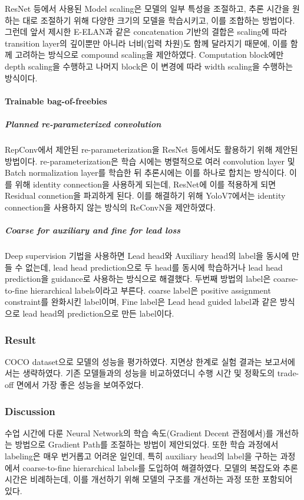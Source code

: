 ResNet\cite{Resnet} 등에서 사용된 Model scaling은 모델의 일부 특성을 조절하고, 추론 시간을 원하는 대로 조절하기 위해
다양한 크기의 모델을 학습시키고, 이를 조합하는 방법이다.
그런데 앞서 제시한 E-ELAN과 같은 concatenation 기반의 결합은 scaling에 따라
transition layer의 깊이뿐만 아니라 너비(입력 차원)도 함께 달라지기 때문에, 이를 함께 고려하는 방식으로 compound scaling을 제안하였다.
Computation block에만 depth scaling을 수행하고 나머지 block은 이 변경에 따라 width scaling을 수행하는 방식이다.

\paragraph*{Trainable bag-of-freebies}

\subparagraph*{Planned re-parameterized convolution} RepConv에서 제안된 re-parameterization을 ResNet 등에서도 활용하기 위해 제안된 방법이다.
re-parameterization은 학습 시에는 병렬적으로 여러 convolution layer 및 Batch normalization layer를 학습한 뒤
추론시에는 이를 하나로 합치는 방식이다. 이를 위해 identity connection을 사용하게 되는데, ResNet에 이를 적용하게 되면 Residual connetion을 파괴하게 된다.
이를 해결하기 위해 YoloV7에서는 identity connection을 사용하지 않는 방식의 ReConvN을 제안하였다.
\subparagraph*{Coarse for auxiliary and fine for lead loss}
Deep supervision 기법을 사용하면 Lead head와 Auxiliary head의 label을 동시에 만들 수 없는데,
lead head prediction으로 두 head를 동시에 학습하거나 lead head prediction을 guidance로 사용하는 방식으로 해결했다.
두번째 방법의 label은 coarse-to-fine hierarchical labels이라고 부른다.
coarse label은 positive assignment constraint를 완화시킨 label이며, Fine label은 Lead head guided label과 같은 방식으로
lead head의 prediction으로 만든 label이다.

\subsubsection{Result}
COCO dataset으로 모델의 성능을 평가하였다. 지면상 한계로 실험 결과는 보고서에서는 생략하였다.
기존 모델들과의 성능을 비교하였더니 수행 시간 및 정확도의 trade-off 면에서 가장 좋은 성능을 보여주었다.
\subsubsection{Discussion}
수업 시간에 다룬 Neural Network의 학습 속도(Gradient Decent 관점에서)를 개선하는 방법으로
Gradient Path를 조절하는 방법이 제안되었다.
또한 학습 과정에서 labeling은 매우 번거롭고 어려운 일인데, 특히 auxiliary head의 label을 구하는 과정에서
coarse-to-fine hierarchical labels를 도입하여 해결하였다.
모델의 복잡도와 추론 시간은 비례하는데, 이를 개선하기 위해 모델의 구조를 개선하는 과정 또한 포함되어 있다.